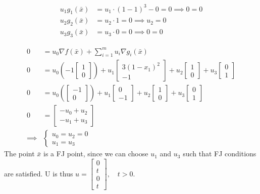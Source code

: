 \documentclass{article}
\begin{document}
	\begin{align}
		u_1 g_1(\bar{x}) &= u_1\cdot (1-1)^3-0 = 0 \implies 0=0 \\
		u_2 g_2(\bar{x}) &= u_2\cdot 1 = 0 \implies u_2 = 0\\
		u_3 g_3(\bar{x}) &= u_3\cdot 0 = 0 \implies 0=0
	\end{align}
	
	\begin{align}
		0 &= u_0 \nabla f(\bar{x}) + \sum_{i=1}^{m} u_i \nabla g_i(\bar{x}) \\
		0 &= u_0 (-1 \begin{bmatrix} 1 \\ 0 \end{bmatrix}) + u_1 \begin{bmatrix}3(1-x_1)^2 \\ -1 \end{bmatrix} + u_2 \begin{bmatrix} 1 \\ 0 \end{bmatrix} + u_3 \begin{bmatrix} 0 \\ 1 \end{bmatrix} \\
		0 &= u_0 ( \begin{bmatrix} -1 \\ 0 \end{bmatrix}) + u_1 \begin{bmatrix} 0 \\ -1 \end{bmatrix} + u_2 \begin{bmatrix} 1 \\ 0 \end{bmatrix} + u_3 \begin{bmatrix} 0 \\ 1 \end{bmatrix} \\
		0 &= \begin{bmatrix}
			-u_0+u_2 \\
			-u_1+u_3
		\end{bmatrix}\\
		\implies & \begin{cases}
			u_0 = u_2  = 0\\
			u_1 = u_3
		\end{cases}		
	\end{align}
	The point $\bar{x}$ is a FJ point, since we can choose $u_1$ and $u_3$ such that FJ conditions are satisfied. U is thus $u= \begin{bmatrix} 0 \\ t \\ 0 \\ t\end{bmatrix},\quad t > 0$.
\end{document}
